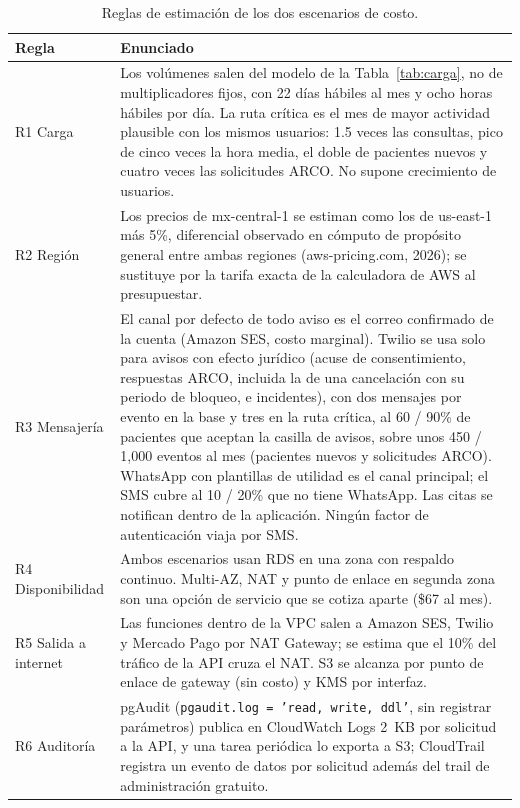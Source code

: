 \documentclass[12pt, a4paper]{article}
\begin{document}
\begin{table}[!htbp]
  \centering
  \caption{Reglas de estimación de los dos escenarios de costo.}
  \label{tab:costos-reglas}
  \footnotesize
  \begin{tabularx}{\textwidth}{l X}
    \toprule
    \textbf{Regla} & \textbf{Enunciado} \\
    \midrule
    R1 Carga & Los volúmenes salen del modelo de la Tabla~\ref{tab:carga}, no de multiplicadores fijos, con 22 días hábiles al mes y ocho horas hábiles por día. La ruta crítica es el mes de mayor actividad plausible con los mismos usuarios: 1.5 veces las consultas, pico de cinco veces la hora media, el doble de pacientes nuevos y cuatro veces las solicitudes ARCO. No supone crecimiento de usuarios. \\
    R2 Región & Los precios de mx-central-1 se estiman como los de us-east-1 más 5\%, diferencial observado en cómputo de propósito general entre ambas regiones (aws-pricing.com, 2026); se sustituye por la tarifa exacta de la calculadora de AWS al presupuestar. \\
    R3 Mensajería & El canal por defecto de todo aviso es el correo confirmado de la cuenta (Amazon SES, costo marginal). Twilio se usa solo para avisos con efecto jurídico (acuse de consentimiento, respuestas ARCO, incluida la de una cancelación con su periodo de bloqueo, e incidentes), con dos mensajes por evento en la base y tres en la ruta crítica, al 60 / 90\% de pacientes que aceptan la casilla de avisos, sobre unos 450 / 1,000 eventos al mes (pacientes nuevos y solicitudes ARCO). WhatsApp con plantillas de utilidad es el canal principal; el SMS cubre al 10 / 20\% que no tiene WhatsApp. Las citas se notifican dentro de la aplicación. Ningún factor de autenticación viaja por SMS. \\
    R4 Disponibilidad & Ambos escenarios usan RDS en una zona con respaldo continuo. Multi-AZ, NAT y punto de enlace en segunda zona son una opción de servicio que se cotiza aparte (\$67 al mes). \\
    R5 Salida a internet & Las funciones dentro de la VPC salen a Amazon SES, Twilio y Mercado Pago por NAT Gateway; se estima que el 10\% del tráfico de la API cruza el NAT. S3 se alcanza por punto de enlace de gateway (sin costo) y KMS por interfaz. \\
    R6 Auditoría & pgAudit (\texttt{pgaudit.log = 'read, write, ddl'}, sin registrar parámetros) publica en CloudWatch Logs 2~KB por solicitud a la API, y una tarea periódica lo exporta a S3; CloudTrail registra un evento de datos por solicitud además del trail de administración gratuito. \\

\end{tabularx}
\end{table}
\end{document}
